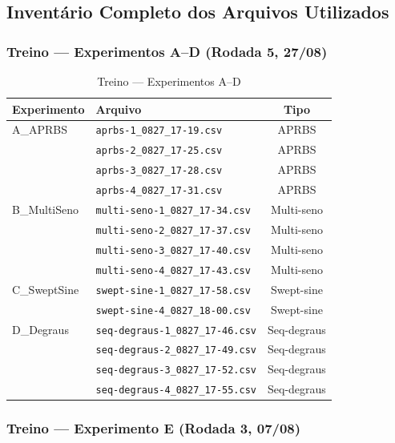 \documentclass[11pt,a4paper]{article}
\begin{document}
\subsection{Inventário Completo dos Arquivos Utilizados}

\subsubsection*{Treino — Experimentos A--D (Rodada 5, 27/08)}

\begin{table}[hbt!]
\centering
\caption{Treino --- Experimentos A--D}
\vspace{0.2cm}
\begin{tabular}{llc}
\toprule
\textbf{Experimento} & \textbf{Arquivo} & \textbf{Tipo} \\
\midrule
A\_APRBS & \texttt{aprbs-1\_0827\_17-19.csv} & APRBS \\
 & \texttt{aprbs-2\_0827\_17-25.csv} & APRBS \\
 & \texttt{aprbs-3\_0827\_17-28.csv} & APRBS \\
 & \texttt{aprbs-4\_0827\_17-31.csv} & APRBS \\
\midrule
B\_MultiSeno & \texttt{multi-seno-1\_0827\_17-34.csv} & Multi-seno \\
 & \texttt{multi-seno-2\_0827\_17-37.csv} & Multi-seno \\
 & \texttt{multi-seno-3\_0827\_17-40.csv} & Multi-seno \\
 & \texttt{multi-seno-4\_0827\_17-43.csv} & Multi-seno \\
\midrule
C\_SweptSine & \texttt{swept-sine-1\_0827\_17-58.csv} & Swept-sine \\
 & \texttt{swept-sine-4\_0827\_18-00.csv} & Swept-sine \\
\midrule
D\_Degraus & \texttt{seq-degraus-1\_0827\_17-46.csv} & Seq-degraus \\
 & \texttt{seq-degraus-2\_0827\_17-49.csv} & Seq-degraus \\
 & \texttt{seq-degraus-3\_0827\_17-52.csv} & Seq-degraus \\
 & \texttt{seq-degraus-4\_0827\_17-55.csv} & Seq-degraus \\
\bottomrule
\end{tabular}
\end{table}

\subsubsection*{Treino — Experimento E (Rodada 3, 07/08)}
\end{document}
